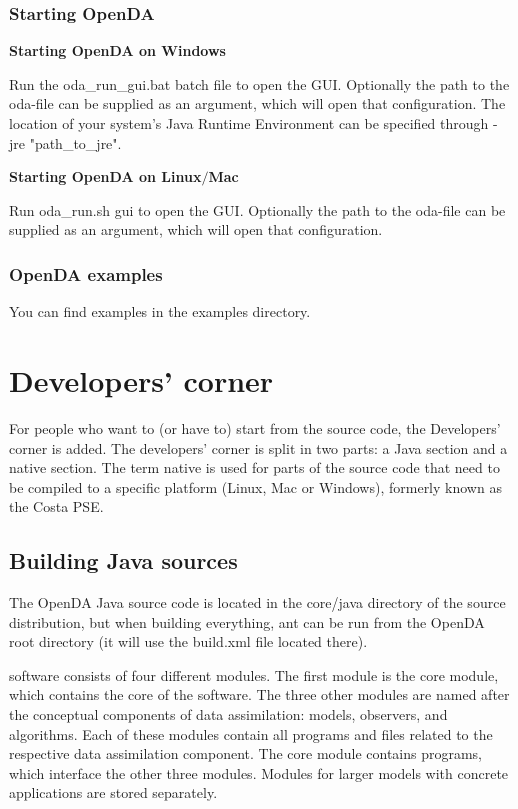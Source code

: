 \subsection{Starting OpenDA}
\textbf{Starting OpenDA on Windows}

Run the oda\_run\_gui.bat batch file to open the \oda GUI. Optionally the path to the oda-file can be supplied as an argument, which will open that \oda configuration. The location of your system's Java Runtime Environment can be specified through -jre "path\_to\_jre".

\textbf{Starting OpenDA on Linux$/$Mac}

Run oda\_run.sh \-gui to open the \oda GUI. Optionally the path to the oda-file can be supplied as an argument, which will open that \oda configuration.

\subsection{OpenDA examples}
You can find examples in the examples directory.

\chapter{Developers' corner}
For people who want to (or have to) start from the \oda source code, the Developers' corner is added. The developers' corner is split in two parts: a Java section and a native section. The term native is used for parts of the source code that need to be compiled to a specific platform (Linux, Mac or Windows), formerly known as the Costa PSE.

\section{Building Java sources}
The OpenDA Java source code is located in the core/java directory of the source distribution, but when building everything, ant can be run from the OpenDA root directory (it will use the build.xml file located there).

\oda software consists of four different modules. The first module is the core module, which contains the core of the \oda software. The three other modules are named after the conceptual components of data assimilation: models, observers, and algorithms. Each of these modules contain all programs and files related to the respective data assimilation component. The core module contains programs, which interface the other three modules. Modules for larger models with concrete applications are stored separately.

